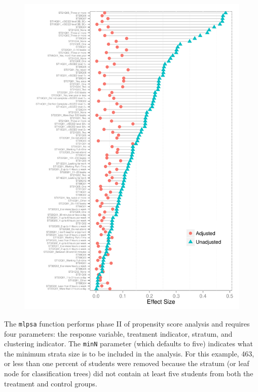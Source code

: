 \documentclass[letterpaper,12p,twoside]{article} %
\begin{document}
\begin{figure}[h!]
\begin{center}
\includegraphics[width=\textwidth]{../Figures/pisabalance.pdf}
\end{center}
\end{figure}

\clearpage

The \texttt{mlpsa} function performs phase II of propensity score analysis and requires four parameters: the response variable, treatment indicator, stratum, and clustering indicator. The \texttt{minN} parameter (which defaults to five) indicates what the minimum strata size is to be included in the analysis. For this example, 463, or less than one percent of students were removed because the stratum (or leaf node for classification trees) did not contain at least five students from both the treatment and control groups.
\end{document}
